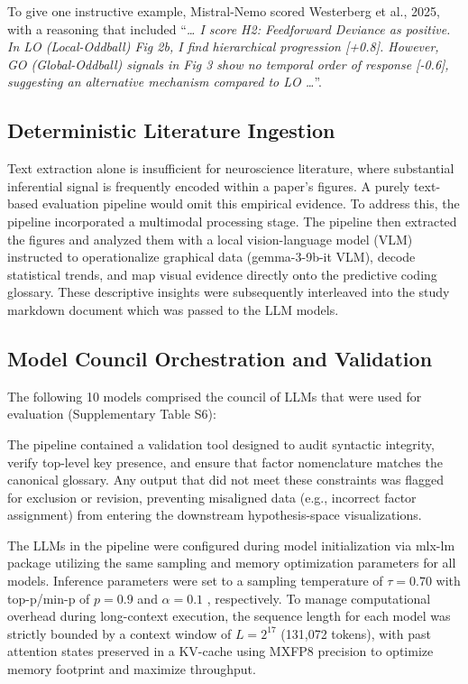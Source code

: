 \documentclass[12pt]{article}
\begin{document}
To give one instructive example, Mistral-Nemo scored Westerberg et al., 2025, with a reasoning that included ``\emph{\ldots{} I score H2: Feedforward Deviance as positive. In LO (Local-Oddball) Fig 2b, I find hierarchical progression {[}+0.8{]}. However, GO (Global-Oddball) signals in Fig 3 show no temporal order of response {[}-0.6{]}, suggesting an alternative mechanism compared to LO \ldots{}}''.

\subsection{Deterministic Literature Ingestion}\label{deterministic-literature-ingestion}

Text extraction alone is insufficient for neuroscience literature, where substantial inferential signal is frequently encoded within a paper's figures. A purely text-based evaluation pipeline would omit this empirical evidence. To address this, the pipeline incorporated a multimodal processing stage. The pipeline then extracted the figures and analyzed them with a local vision-language model (VLM) instructed to operationalize graphical data (gemma-3-9b-it VLM), decode statistical trends, and map visual evidence directly onto the predictive coding glossary. These descriptive insights were subsequently interleaved into the study markdown document which was passed to the LLM models.

\subsection{Model Council Orchestration and Validation}\label{model-council-orchestration-and-validation}

The following 10 models comprised the council of LLMs that were used for evaluation (Supplementary Table S6):




The pipeline contained a validation tool designed to audit syntactic integrity, verify top-level key presence, and ensure that factor nomenclature matches the canonical glossary. Any output that did not meet these constraints was flagged for exclusion or revision, preventing misaligned data (e.g., incorrect factor assignment) from entering the downstream hypothesis-space visualizations.

The LLMs in the pipeline were configured during model initialization via mlx-lm package utilizing the same sampling and memory optimization parameters for all models. Inference parameters were set to a sampling temperature of $\tau = 0.70$ with top-p/min-p of $p = 0.9$ and $\alpha = 0.1$ \cite{ref84} , respectively. To manage computational overhead during long-context execution, the sequence length for each model was strictly bounded by a context window of $L = 2^{17}$ (131,072 tokens), with past attention states preserved in a KV-cache using MXFP8\cite{ref85} precision to optimize memory footprint and maximize throughput.
\end{document}
